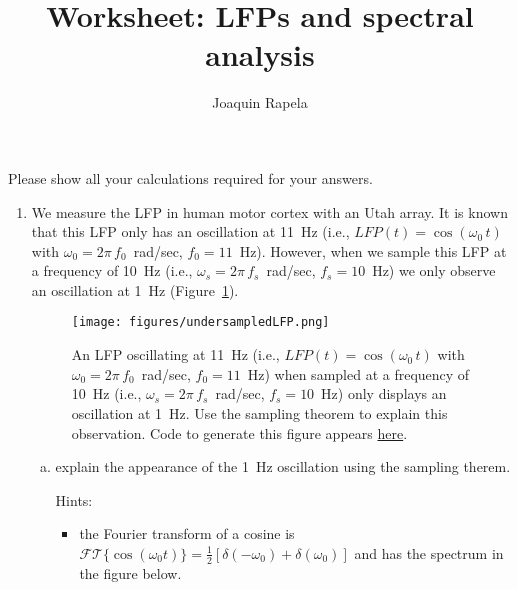 \documentclass[12pt]{article}
\title{Worksheet: LFPs and spectral analysis}
\author{Joaquin Rapela}
\begin{document}
\maketitle

Please show all your calculations required for your answers.

\begin{enumerate}

    \item We measure the LFP in human motor cortex with an Utah array. It is
        known that this LFP only has an oscillation at 11~Hz (i.e.,
        $LFP(t)=\cos(\omega_0\,t)$ with $\omega_0=2\pi\,f_0$~rad/sec,
        $f_0=11$~Hz). However, when we sample this LFP at a frequency of 10~Hz
        (i.e., $\omega_s=2\pi\,f_s$~rad/sec, $f_s=10$~Hz) we only observe an
        oscillation at 1~Hz (Figure~\ref{fig:undersampledLFP}).

        \begin{figure}
            \begin{center}
                \texttt{[image: figures/undersampledLFP.png]}

                \caption{An LFP oscillating at 11~Hz (i.e., $LFP(t)=\cos(\omega_0\,t)$ with $\omega_0=2\pi\,f_0$~rad/sec,
                $f_0=11$~Hz) when sampled at a frequency of 10~Hz (i.e.,
                $\omega_s=2\pi\,f_s$~rad/sec, $f_s=10$~Hz) only displays an
                oscillation at 1~Hz. Use the sampling theorem to explain this
                observation.  Code to generate this figure appears
                \href{https://github.com/joacorapela/neuroinformatics24/blob/master/worksheets/02_LFPs_spectralAnalysis/code/doExUndersampledLFP.py}{here}.}

            \end{center}
            \label{fig:undersampledLFP}
        \end{figure}

        \begin{enumerate}[(a)]

            \item explain the appearance of the 1~Hz oscillation using the
                sampling therem.

                Hints:

                \begin{itemize}

                    \item the Fourier transform of a cosine is
                        $\mathcal{FT}\{\cos(\omega_0
                        t)\}=\frac{1}{2}[\delta(-\omega_0)+\delta(\omega_0)]$
                        and has the spectrum in the figure below.
                        


\end{itemize}
\end{enumerate}
\end{enumerate}
\end{document}
